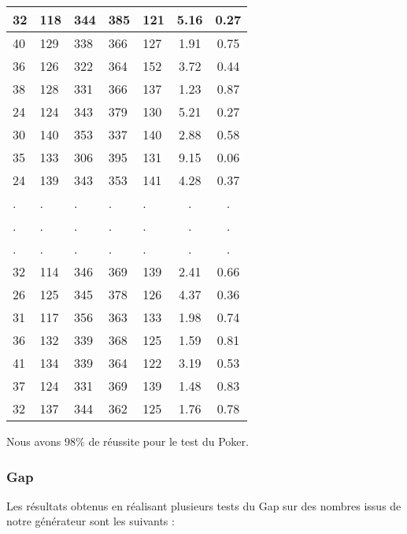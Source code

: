 \documentclass[12pt,a4paper]{article}
\begin{document}
\begin{center}
\begin{tabular}{|l|l|l|l|l|c|c|}
32 & 118 & 344 & 385 & 121 &  5.16 &  0.27\\ \hline
40 & 129 & 338 & 366 & 127 &  1.91 &  0.75\\ \hline
36 & 126 & 322 & 364 & 152 &  3.72 &  0.44\\ \hline
38 & 128 & 331 & 366 & 137 &  1.23 &  0.87\\ \hline
24 & 124 & 343 & 379 & 130 &  5.21 &  0.27\\ \hline
30 & 140 & 353 & 337 & 140 &  2.88 &  0.58\\ \hline
35 & 133 & 306 & 395 & 131 &  9.15 &  0.06\\ \hline
24 & 139 & 343 & 353 & 141 &  4.28 &  0.37\\ \hline
 . & . & . & . & . & . & . \\ \hline
 . & . & . & . & . & . & . \\ \hline
 . & . & . & . & . & . & . \\ \hline
32 & 114 & 346 & 369 & 139 &  2.41 &  0.66\\ \hline
26 & 125 & 345 & 378 & 126 &  4.37 &  0.36\\ \hline
31 & 117 & 356 & 363 & 133 &  1.98 &  0.74\\ \hline
36 & 132 & 339 & 368 & 125 &  1.59 &  0.81\\ \hline
41 & 134 & 339 & 364 & 122 &  3.19 &  0.53\\ \hline
37 & 124 & 331 & 369 & 139 &  1.48 &  0.83\\ \hline
32 & 137 & 344 & 362 & 125 &  1.76 &  0.78\\ \hline
\end{tabular}
\end{center}
Nous avons $98\%$ de réussite pour le test du Poker.

\newpage
\subsubsection{Gap}

Les résultats obtenus en réalisant plusieurs tests du Gap sur des nombres issus
de notre générateur sont les suivants :
\end{document}
